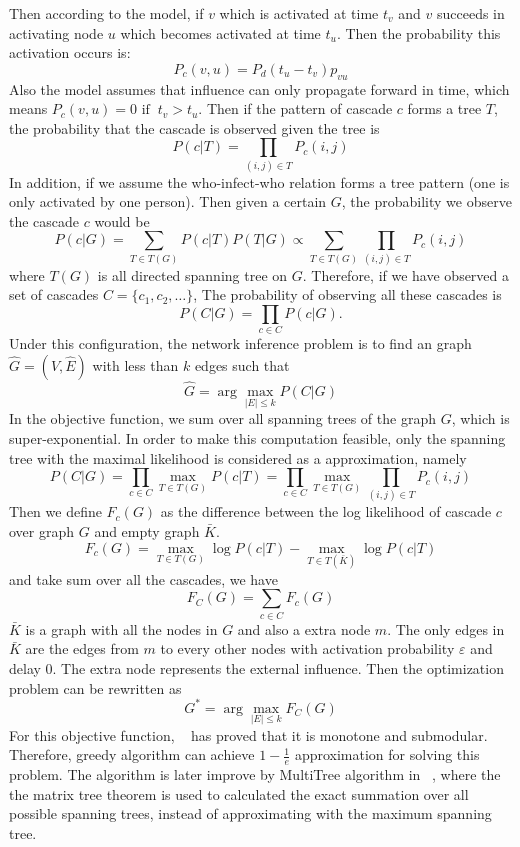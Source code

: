 Then according to the model, if $v$ which is activated at time $t_v$ and $v$ succeeds in activating node $u$ which becomes activated at time $t_u$. Then the probability this activation occurs is:
$$
P_c(v,u)=P_d(t_u-t_v)p_{vu}
$$
Also the model assumes that influence can only propagate forward in time, which means $
P_c(v,u)=0 \text{\ if\ }\ t_v>t_u.
$
Then if the pattern of cascade $c$ forms a tree $T$, the probability that the cascade is observed given the tree is
$$
P(c|T)=\prod_{(i,j)\in T}P_c(i,j)
$$
In addition, if we assume the who-infect-who relation forms a tree pattern (one is only activated by one person). Then given a certain $G$, the probability we observe the cascade $c$ would be
$$
P(c|G)=\sum_{T\in T(G)}P(c|T)P(T|G)\propto \sum_{T\in T(G)}\prod_{(i,j)\in T}P_c(i,j)
$$
where $T(G)$ is all directed spanning tree on $G$.
Therefore, if we have observed a set of cascades $C=\{c_1,c_2,\ldots\}$,
The probability of observing all these cascades is
$$
P(C|G)=\prod_{c\in C}P(c|G).
$$
Under this configuration, the network inference problem is to find an graph $\hat{G}=(V,\hat{E})$ with less than $k$ edges such that
$$
\hat{G} = \arg\max_{|E|\leq k} P(C|G)
$$
In the objective function, we sum over all spanning trees of the graph $G$, which is super-exponential. In order to make this computation feasible, only the spanning tree with the maximal likelihood is considered as a approximation, namely
$$
P(C|G)=\prod_{c\in C}\max_{T\in T(G)}P(c|T)=\prod_{c\in C}\max_{T\in T(G)}\prod_{(i,j)\in T}P_c(i,j)
$$
Then we define $F_c(G)$ as the difference between the log likelihood of cascade $c$ over graph $G$ and empty graph $\bar{K}$.
$$
F_c(G)=\max_{T\in T(G)}\log P(c|T)-\max_{T \in T(\bar{K})}\log P(c|T)
$$
and take sum over all the cascades, we have
$$
F_C(G)=\sum_{c\in C}F_c(G)
$$
$\bar{K}$ is a graph with all the nodes in $G$ and also a extra node $m$. The only edges in $\bar{K}$ are the edges from $m$ to every other nodes with activation probability $\varepsilon$ and delay $0$. The extra node represents the external influence.
Then the optimization problem can be rewritten as
\begin{equation}\label{Equ:SubObj}
G^*=\arg\max_{|E|\leq k}F_C(G)
\end{equation}
For this objective function, ~\cite{GJA10} has proved that it is monotone and submodular. Therefore, greedy algorithm can achieve $1-\frac{1}{e}$ approximation for solving this problem. The algorithm is later improve by MultiTree algorithm in ~\cite{GB12}, where the the matrix tree theorem is used to calculated the exact summation over all possible spanning trees, instead of approximating with the maximum spanning tree.

